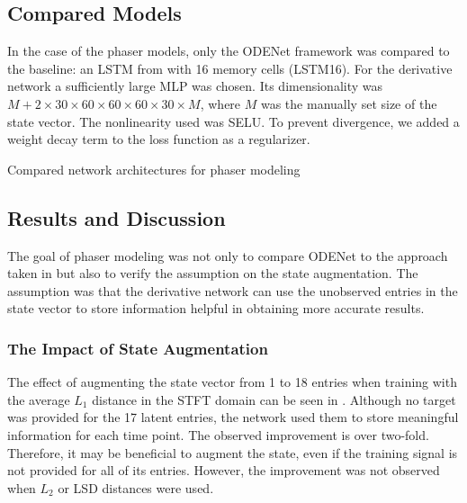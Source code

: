\subsection{Compared Models}
\label{sec:phaser_models}

In the case of the phaser models, only the ODENet framework was compared to the baseline: an \ac{LSTM} from \cite{Wright2020} with 16 memory cells (\ac{LSTM}16). For the derivative network a sufficiently large \ac{MLP} was chosen. Its dimensionality was $M + 2 \times 30 \times 60 \times 60\times 60 \times 30\times M$, where $M$ was the manually set size of the state vector. The nonlinearity used was \ac{SELU}. To prevent divergence, we added a weight decay term to the loss function as a regularizer.

\begin{table}[]
    \centering
    
    \caption{Compared network architectures for phaser modeling}
    \label{tab:phaser_models_data}
\end{table}

\subsection{Results and Discussion}
\label{sec:phaser_results}

The goal of phaser modeling was not only to compare ODENet to the approach taken in \cite{Wright2020} but also to verify the assumption on the state augmentation. The assumption was that the derivative network can use the unobserved entries in the state vector to store information helpful in obtaining more accurate results.

\subsubsection{The Impact of State Augmentation}
The effect of augmenting the state vector from 1 to 18 entries when training with the average $L_1$ distance in the \ac{STFT} domain can be seen in . Although no target was provided for the 17 latent entries, the network used them to store meaningful information for each time point. The observed improvement is over two-fold. Therefore, it may be beneficial to augment the state, even if the training signal is not provided for all of its entries. However, the improvement was not observed when $L_2$ or \ac{LSD} distances were used.

